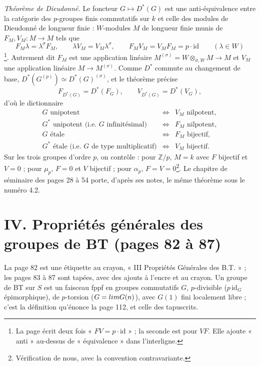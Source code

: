 \documentclass[11pt,a4paper]{article}
\begin{document}
\emph{Théorème de Dieudonné.} Le foncteur $G \mapsto D^{*}(G)$ est une
anti-équivalence entre la catégorie des $p$-groupes finis commutatifs sur
$k$ et celle des modules de Dieudonné de longueur finie : $W$-modules $M$
de longueur finie munis de $F_M, V_M \colon M \to M$ tels que
\[
F_M \lambda = \lambda^{\sigma} F_M, \qquad
\lambda V_M = V_M \lambda^{\sigma}, \qquad
F_M V_M = V_M F_M = p \cdot \mathrm{id}
\qquad (\lambda \in W)
\]
\footnote{La page écrit deux fois « $FV = p\cdot\mathrm{id}$ » ; la
seconde est pour $VF$. Elle ajoute « anti » au-dessus de « équivalence »
dans l'interligne.}. Autrement dit $F_M$ est une application linéaire
$M^{(\sigma)} = W \otimes_{\sigma, W} M \to M$ et $V_M$ une application
linéaire $M \to M^{(\sigma)}$. Comme $D^{*}$ commute au changement de
base, $D^{*}(G^{(p)}) \simeq D^{*}(G)^{(\sigma)}$, et le théorème précise
\[
F_{D^{*}(G)} = D^{*}(F_G), \qquad V_{D^{*}(G)} = D^{*}(V_G),
\]
d'où le dictionnaire
\[
\begin{array}{lcl}
G \text{ unipotent} & \iff & V_M \text{ nilpotent}, \\
G^{*} \text{ unipotent (i.e. } G \text{ infinitésimal)} & \iff & F_M \text{ nilpotent}, \\
G \text{ étale} & \iff & F_M \text{ bijectif}, \\
G^{*} \text{ étale (i.e. } G \text{ de type multiplicatif)} & \iff & V_M \text{ bijectif}.
\end{array}
\]
Sur les trois groupes d'ordre $p$, on contrôle : pour $\mathbb{Z}/p$,
$M = k$ avec $F$ bijectif et $V = 0$ ; pour $\mu_p$, $F = 0$ et $V$
bijectif ; pour $\alpha_p$, $F = V = 0$\footnote{Vérification de nous,
avec la convention contravariante.}. Le chapitre de séminaire des pages 28
à 54 porte, d'après ses notes, le même théorème sous le numéro 4.2.

\section*{IV. Propriétés générales des groupes de BT (pages 82 à 87)}

La page 82 est une étiquette au crayon, « III Propriétés Générales des
B.T. » ; les pages 83 à 87 sont tapées, avec des ajouts à l'encre et au
crayon. Un groupe de BT sur $S$ est un faisceau fppf en groupes
commutatifs $G$, $p$-divisible ($p\,\mathrm{id}_G$ épimorphique), de
$p$-torsion ($G = \varinjlim G(n)$), avec $G(1)$ fini localement libre ;
c'est la définition qu'énonce la page 112, et celle des tapuscrits.
\end{document}
